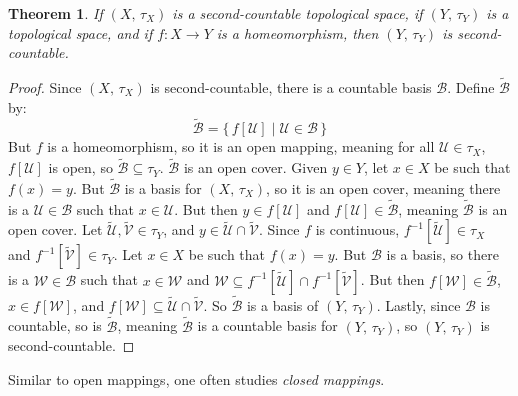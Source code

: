 \documentclass{article}
\theoremstyle{plain}
\newtheorem{theorem}{Theorem}[section]
\theoremstyle{normal}
\begin{document}
        \begin{theorem}
            If $(X,\,\tau_{X})$ is a second-countable topological space, if
            $(Y,\,\tau_{Y})$ is a topological space, and if $f:X\rightarrow{Y}$
            is a homeomorphism, then $(Y,\,\tau_{Y})$ is second-countable.
        \end{theorem}
        \begin{proof}
            Since $(X,\,\tau_{X})$ is second-countable, there is a
            countable basis $\mathcal{B}$. Define
            $\tilde{\mathcal{B}}$ by:
            \begin{equation}
                \tilde{\mathcal{B}}=
                \{\,f[\mathcal{U}]\;|\;\mathcal{U}\in\mathcal{B}\,\}
            \end{equation}
            But $f$ is a homeomorphism, so it is an open mapping, meaning for
            all $\mathcal{U}\in\tau_{X}$, $f[\mathcal{U}]$ is open, so
            $\tilde{\mathcal{B}}\subseteq\tau_{Y}$. $\tilde{\mathcal{B}}$ is an
            open cover. Given $y\in{Y}$, let $x\in{X}$ be such that
            $f(x)=y$. But $\tilde{\mathcal{B}}$ is a basis for $(X,\,\tau_{X})$,
            so it is an open cover, meaning there is a
            $\mathcal{U}\in\mathcal{B}$ such that $x\in\mathcal{U}$. But then
            $y\in{f}[\mathcal{U}]$ and $f[\mathcal{U}]\in\tilde{\mathcal{B}}$,
            meaning $\tilde{\mathcal{B}}$ is an open cover.
            Let $\tilde{\mathcal{U}},\tilde{\mathcal{V}}\in\tau_{Y}$, and
            $y\in\tilde{\mathcal{U}}\cap\tilde{\mathcal{V}}$. Since $f$ is
            continuous, $f^{-1}[\tilde{\mathcal{U}}]\in\tau_{X}$ and
            $f^{-1}[\tilde{\mathcal{V}}]\in\tau_{Y}$. Let $x\in{X}$ be such that
            $f(x)=y$. But $\mathcal{B}$ is a basis, so there is a
            $\mathcal{W}\in\mathcal{B}$ such that $x\in\mathcal{W}$ and
            $\mathcal{W}\subseteq{f}^{-1}[\tilde{\mathcal{U}}]\cap{f}^{-1}[\tilde{\mathcal{V}}]$.
            But then $f[\mathcal{W}]\in\tilde{\mathcal{B}}$,
            $x\in{f}[\mathcal{W}]$, and
            $f[\mathcal{W}]\subseteq\tilde{\mathcal{U}}\cap\tilde{\mathcal{V}}$.
            So $\tilde{\mathcal{B}}$ is a basis of $(Y,\,\tau_{Y})$. Lastly,
            since $\mathcal{B}$ is countable, so is $\tilde{\mathcal{B}}$,
            meaning $\tilde{\mathcal{B}}$ is a countable basis for
            $(Y,\,\tau_{Y})$, so $(Y,\,\tau_{Y})$ is second-countable.
        \end{proof}
        Similar to open mappings, one often studies \textit{closed mappings}.
\end{document}
